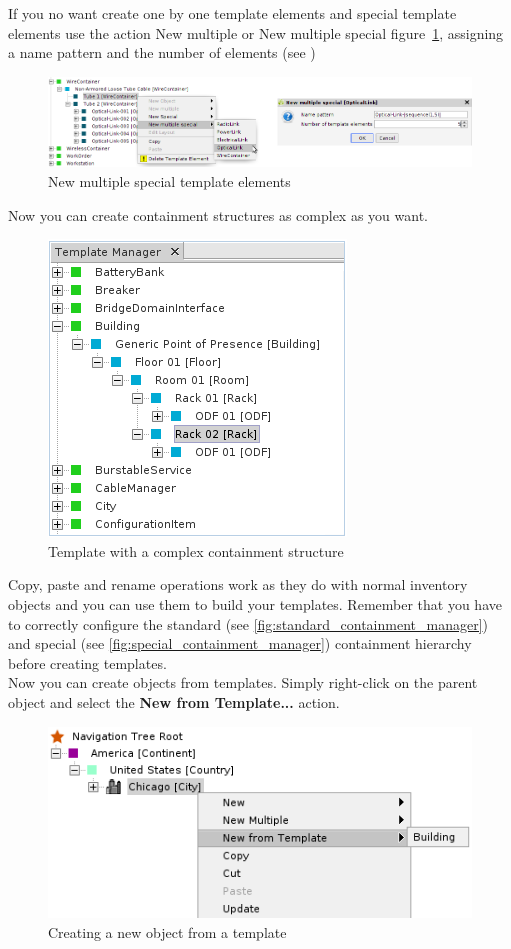 \documentclass[a4paper]{article}
\begin{document}
	If you no want create one by one template elements and special template elements use the action New multiple or New multiple special figure~\ref{fig:template_manager_new_multiple}, assigning a name pattern and the number of elements (see \textbf{})
		
	\begin{figure}[h!]
		\centering
		\includegraphics[width=0.9\linewidth]{img/template_manager_new_multiple.png}
		\caption{New multiple special template elements}
		\label{fig:template_manager_new_multiple}
	\end{figure}
		
	Now you can create containment structures as complex as you want.\\
	
	\begin{figure}[h!]
		\centering
		\includegraphics[width=0.4\linewidth]{img/template_manager_template_containment.png}
		\caption{Template with a complex containment structure}
		\label{fig:template_manager_template_containment}
	\end{figure}
	Copy, paste and rename operations work as they do with normal inventory objects and you can use them to build your templates. Remember that you have to correctly configure the standard (see \ref{fig:standard_containment_manager}) and special (see \ref{fig:special_containment_manager}) containment hierarchy before creating templates.\\
	Now you can create objects from templates. Simply right-click on the parent object and select the \textbf{New from Template...} action.\\
	\begin{figure}[h!]
		\centering
		\includegraphics[width=0.6\linewidth]{img/template_manager_new_from_template.png}
		\caption{Creating a new object from a template}
		\label{fig:template_manager_new_from_template}
	\end{figure}
	
\end{document}
